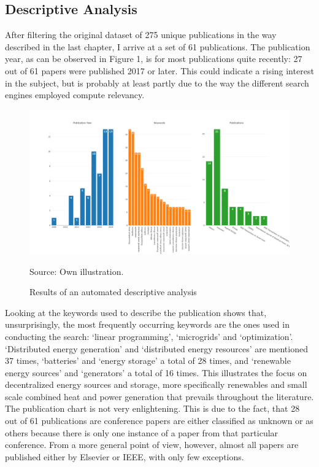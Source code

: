 \documentclass[
	11pt,								%
	DIV10,								%
	a4paper,         					%
	oneside,							%
	headheight=20pt,					%
	footheight=20pt,					%
    parskip=full,						%
    listof=totoc,						%
	bibliography=totoc,					%
	index=totoc,						%
]{scrartcl}
\begin{document}
\subsection{Descriptive Analysis}
After filtering the original dataset of 275 unique publications in the way described in the last chapter, I arrive at a set of 61 publications. The publication year, as can be observed in Figure 1, is for most publications quite recently: 27 out of 61 papers were published 2017 or later. This could indicate a rising interest in the subject, but is probably at least partly due to the way the different search engines employed compute relevancy.  
\begin{figure}[H]
	\centering
	\includegraphics[width=\textwidth]{pictures/Figure_1.png}
	\caption{Results of an automated descriptive analysis}
	\label{descriptive_anaylsis_results}
	\flushleft\quad\quad\footnotesize{Source: Own illustration.}
\end{figure}	
Looking at the keywords used to describe the publication shows that, unsurprisingly, the most frequently occurring keywords are the ones used in conducting the search: `linear programming', `microgrids' and `optimization'. 
`Distributed energy generation' and `distributed energy resources' are mentioned 37 times, `batteries' and `energy storage' a total of 28 times, and `renewable energy sources' and `generators' a total of 16 times. 
This illustrates the focus on decentralized energy sources and storage, more specifically renewables and small scale combined heat and power generation that prevails throughout the literature.
\\
The publication chart is not very enlightening. This is due to the fact, that 28 out of 61 publications are conference papers are either classified as unknown or as others because there is only one instance of a paper from that particular conference. From a more general point of view, however, almost all papers are published either by Elsevier or IEEE, with only few exceptions.
\end{document}
